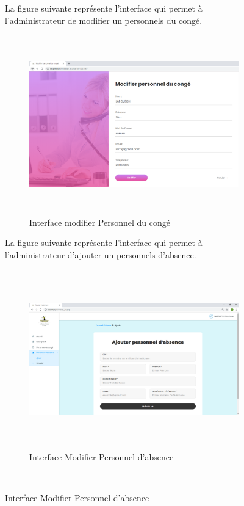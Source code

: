 \documentclass[12 pt]{report}
\begin{document}
\begin{figure}[h]
\begin{center}
La figure suivante représente l'interface qui permet à l'administrateur de modifier un personnels du congé.
\begin{figure}[h]
 \begin{center}
\includegraphics[width= 18 cm ,height=  7.75cm]{modifier_pc.PNG}
\caption{Interface modifier Personnel du congé}

\end{center}
\end{figure}
\newpage
La figure suivante représente l'interface qui permet à l'administrateur d'ajouter un personnels d'absence.
\begin{figure}[h]
 \begin{center}
\includegraphics[width= 18 cm ,height=  7.75cm]{ajouter_pa.PNG}
\caption{Interface Modifier Personnel d'absence}

\end{center}
\end{figure}\\


\end{center}
\end{figure}
\end{document}
